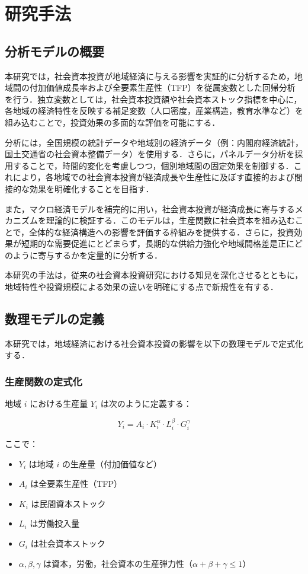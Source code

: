 \chapter{研究手法}

\section{分析モデルの概要}
本研究では，社会資本投資が地域経済に与える影響を実証的に分析するため，地域間の付加価値成長率および全要素生産性（TFP）を従属変数とした回帰分析を行う．独立変数としては，社会資本投資額や社会資本ストック指標を中心に，各地域の経済特性を反映する補足変数（人口密度，産業構造，教育水準など）を組み込むことで，投資効果の多面的な評価を可能にする．

分析には，全国規模の統計データや地域別の経済データ（例：内閣府経済統計，国土交通省の社会資本整備データ）を使用する．さらに，パネルデータ分析を採用することで，時間的変化を考慮しつつ，個別地域間の固定効果を制御する．これにより，各地域での社会資本投資が経済成長や生産性に及ぼす直接的および間接的な効果を明確化することを目指す．

また，マクロ経済モデルを補完的に用い，社会資本投資が経済成長に寄与するメカニズムを理論的に検証する．このモデルは，生産関数に社会資本を組み込むことで，全体的な経済構造への影響を評価する枠組みを提供する．さらに，投資効果が短期的な需要促進にとどまらず，長期的な供給力強化や地域間格差是正にどのように寄与するかを定量的に分析する．

本研究の手法は，従来の社会資本投資研究における知見を深化させるとともに，地域特性や投資規模による効果の違いを明確にする点で新規性を有する．

\section{数理モデルの定義}

本研究では，地域経済における社会資本投資の影響を以下の数理モデルで定式化する．

\subsection{生産関数の定式化}

地域 \( i \) における生産量 \( Y_i \) は次のように定義する：

\[
	Y_i = A_i \cdot K_i^\alpha \cdot L_i^\beta \cdot G_i^\gamma
\]

ここで：
\begin{itemize}
	\renewcommand{\labelitemi}{}
	\item \( Y_i \) は地域 \( i \) の生産量（付加価値など）
	\item \( A_i \) は全要素生産性（TFP）
	\item \( K_i \) は民間資本ストック
	\item \( L_i \) は労働投入量
	\item \( G_i \) は社会資本ストック
	\item \( \alpha, \beta, \gamma \) は資本，労働，社会資本の生産弾力性（\( \alpha + \beta + \gamma \leq 1 \)）
\end{itemize}

